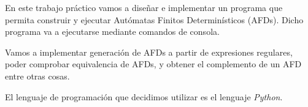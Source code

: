 En este trabajo práctico vamos a diseñar e implementar un programa que permita construir y ejecutar Autómatas Finitos Determinísticos (AFDs). Dicho programa va a ejecutarse mediante comandos de consola.

Vamos a implementar generación de AFDs a partir de expresiones regulares, poder comprobar equivalencia de AFDs, y obtener el complemento de un AFD entre otras cosas.

El lenguaje de programación que decidimos utilizar es el lenguaje \emph{Python}.